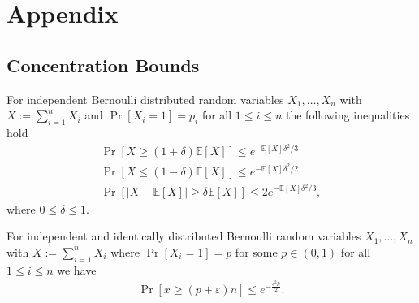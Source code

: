 \chapter{Appendix}
\section{Concentration Bounds}
\begin{lemma}
For independent Bernoulli distributed random variables $X_1, \dotsc, X_n$ with $X := \sum_{i=1}^n X_i$
and $\Pr[X_i = 1] = p_i$ for all $ 1 \leq  i \leq n$ the following inequalities hold
\begin{gather}
\label{ineq:ch0}
\Pr[X \geq (1+\delta) \mathbb{E}[X]] \leq e^{- \mathbb{E}[X] \delta^2/3} \\
\label{ineq:ch1}
\Pr[X \leq (1-\delta) \mathbb{E}[X]] \leq e^{- \mathbb{E}[X] \delta^2/2} \\
\label{ineq:ch2}
\Pr[|X - \mathbb{E}[X]| \geq \delta \mathbb{E}[X]] \leq 2 e^{- \mathbb{E}[X] \delta^2 / 3},
\end{gather}
where $0 \leq \delta \leq 1$.

For independent and identically distributed Bernoulli random variables $X_1, \dotsc, X_n$ with $X := \sum_{i=1}^n X_i$
where $\Pr[X_i = 1] = p$ for some $p \in (0,1)$ for all $ 1 \leq  i \leq n$ we have
\begin{gather}
\label{ineq:ch3}
\Pr[x \geq (p + \varepsilon)n] \leq e^{-\frac{\epsilon^2k}{2}}.
\end{gather}

\end{lemma}
\vspace*{\fill}
\pagebreak

